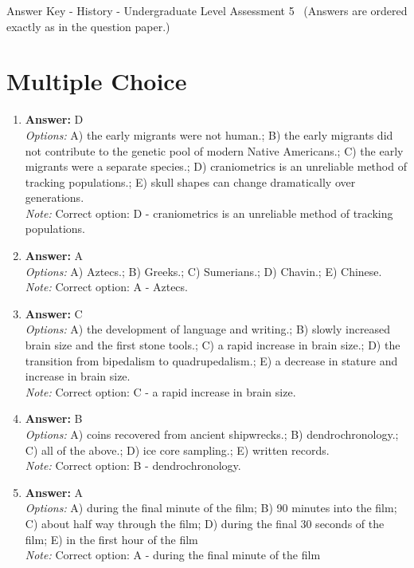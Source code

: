 \documentclass[12pt]{article}
\begin{document}
\begin{center}
Answer Key - History - Undergraduate Level Assessment 5 \
\small (Answers are ordered exactly as in the question paper.)
\end{center}

\section*{Multiple Choice}
\begin{enumerate}[label=\arabic*.]
\item \textbf{Answer:} D
\\ \textit{Options:} A) the early migrants were not human.; B) the early migrants did not contribute to the genetic pool of modern Native Americans.; C) the early migrants were a separate species.; D) craniometrics is an unreliable method of tracking populations.; E) skull shapes can change dramatically over generations.
\\ \textit{Note:} Correct option: D - craniometrics is an unreliable method of tracking populations.
\item \textbf{Answer:} A
\\ \textit{Options:} A) Aztecs.; B) Greeks.; C) Sumerians.; D) Chavin.; E) Chinese.
\\ \textit{Note:} Correct option: A - Aztecs.
\item \textbf{Answer:} C
\\ \textit{Options:} A) the development of language and writing.; B) slowly increased brain size and the first stone tools.; C) a rapid increase in brain size.; D) the transition from bipedalism to quadrupedalism.; E) a decrease in stature and increase in brain size.
\\ \textit{Note:} Correct option: C - a rapid increase in brain size.
\item \textbf{Answer:} B
\\ \textit{Options:} A) coins recovered from ancient shipwrecks.; B) dendrochronology.; C) all of the above.; D) ice core sampling.; E) written records.
\\ \textit{Note:} Correct option: B - dendrochronology.
\item \textbf{Answer:} A
\\ \textit{Options:} A) during the final minute of the film; B) 90 minutes into the film; C) about half way through the film; D) during the final 30 seconds of the film; E) in the first hour of the film
\\ \textit{Note:} Correct option: A - during the final minute of the film
\end{enumerate}
\end{document}

